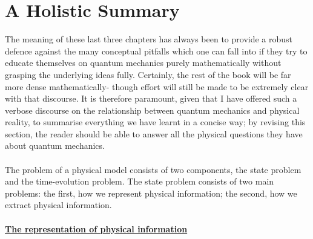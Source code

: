 \section{A Holistic Summary}
The meaning of these last three chapters has always been to provide a robust defence against the many conceptual pitfalls which one can fall into if they try to educate themselves on quantum mechanics purely mathematically without grasping the underlying ideas fully. Certainly, the rest of the book will be far more dense mathematically- though effort will still be made to be extremely clear with that discourse. It is therefore paramount, given that I have offered such a verbose discourse on the relationship between quantum mechanics and physical reality, to summarise everything we have learnt in a concise way; by revising this section, the reader should be able to answer all the physical questions they have about quantum mechanics.
\\\\
The problem of a physical model consists of two components, the state problem and the time-evolution problem. The state problem consists of two main problems: the first, how we represent physical information; the second, how we extract physical information.
\\\\
\textbf{\underline{The representation of physical information}}
